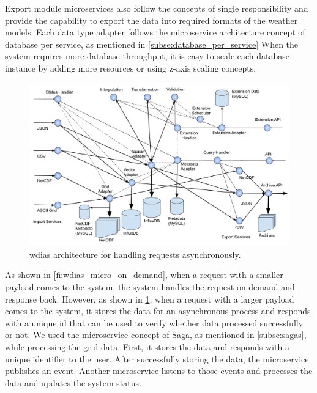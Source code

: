 Export module microservices also follow the concepts of single responsibility and provide the capability to export the data into required formats of the weather models. Each data type adapter follows the microservice architecture concept of database per service, as mentioned in \cref{subse:database_per_service} When the system requires more database throughput, it is easy to scale each database instance by adding more resources or using z-axis scaling concepts.

\begin{figure}[htp]
    \centering
    \includegraphics[width=1\textwidth]{method/microservice/microservice_architecture-handle_on_async-v4.pdf}
    \caption{\acrshort{wdias} architecture for handling requests asynchronously.}
    \label{fi:wdias_micro_async}
\end{figure}

As shown in \cref{fi:wdias_micro_on_demand}, when a request with a smaller payload comes to the system, the system handles the request on-demand and response back. However, as shown in \cref{fi:wdias_micro_async}, when a request with a larger payload comes to the system, it stores the data for an asynchronous process and responds with a unique id that can be used to verify whether data processed successfully or not. We used the microservice concept of Saga, as mentioned in \cref{subse:sagas}, while processing the grid data. First, it stores the data and responds with a unique identifier to the user. After successfully storing the data, the microservice publishes an event. Another microservice listens to those events and processes the data and updates the system status.

